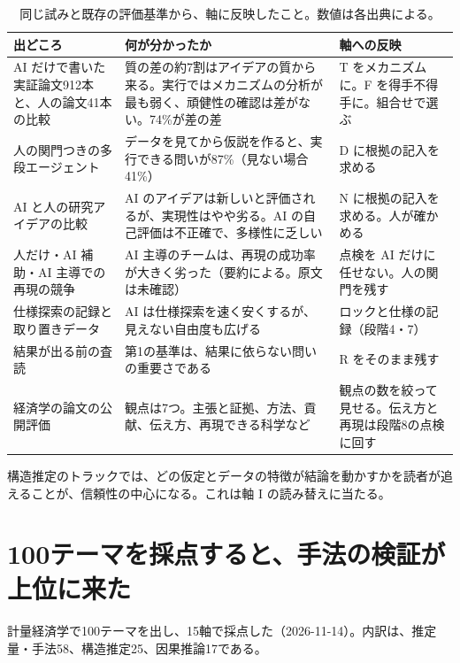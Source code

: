 \documentclass[a4paper,10pt]{ltjsarticle}
\begin{document}
\begin{table}[htbp]
\centering\footnotesize
\begin{tabularx}{\linewidth}{p{4.6cm}XX}
\toprule
出どころ & 何が分かったか & 軸への反映 \\
\midrule
AI だけで書いた実証論文912本と、人の論文41本の比較\parencite{li2026} & 質の差の約7割はアイデアの質から来る。実行ではメカニズムの分析が最も弱く、頑健性の確認は差がない。74\%が差の差 & T をメカニズムに。F を得手不得手に。組合せで選ぶ \\
人の関門つきの多段エージェント\parencite{zhu2026} & データを見てから仮説を作ると、実行できる問いが87\%（見ない場合41\%） & D に根拠の記入を求める \\
AI と人の研究アイデアの比較\parencite{si2024} & AI のアイデアは新しいと評価されるが、実現性はやや劣る。AI の自己評価は不正確で、多様性に乏しい & N に根拠の記入を求める。人が確かめる \\
人だけ・AI 補助・AI 主導での再現の競争\parencite{brodeur2026ai} & AI 主導のチームは、再現の成功率が大きく劣った（要約による。原文は未確認） & 点検を AI だけに任せない。人の関門を残す \\
仕様探索の記録と取り置きデータ\parencite{shin2026} & AI は仕様探索を速く安くするが、見えない自由度も広げる & ロックと仕様の記録（段階4・7） \\
結果が出る前の査読\parencite{jdeprr} & 第1の基準は、結果に依らない問いの重要さである & R をそのまま残す \\
経済学の論文の公開評価\parencite{unjournal} & 観点は7つ。主張と証拠、方法、貢献、伝え方、再現できる科学など & 観点の数を絞って見せる。伝え方と再現は段階8の点検に回す \\
\bottomrule
\end{tabularx}
\caption{同じ試みと既存の評価基準から、軸に反映したこと。数値は各出典による。}
\label{tab:th-others}
\end{table}

構造推定のトラックでは、どの仮定とデータの特徴が結論を動かすかを読者が追えることが、信頼性の中心になる\parencite{andrews2020}。これは軸 I の読み替えに当たる。

\section{100テーマを採点すると、手法の検証が上位に来た}\label{sec:th-pilot}

計量経済学で100テーマを出し、15軸で採点した（2026-11-14）。内訳は、推定量・手法58、構造推定25、因果推論17である。
\end{document}
